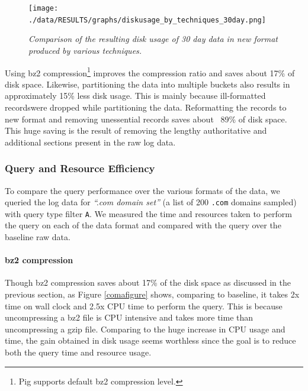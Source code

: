 \documentclass[11pt,a4paper]{article}
\begin{document}
\begin{figure}[H] 
\centering
\texttt{[image: ./data/RESULTS/graphs/diskusage\_by\_techniques\_30day.png]}
\caption {\textit{Comparison of the resulting disk usage of 30 day data in new format produced by various techniques.}}
\end{figure}

Using bz2 compression\footnote{Pig supports default bz2 compression level.} improves the compression ratio and saves about 17\% of disk space. Likewise, partitioning the data into multiple buckets also results in approximately 15\% less disk usage. This is mainly because ill-formatted records\footnotemark were dropped while partitioning the data. Reformatting the records to new format and removing unessential records saves about ~89\% of disk space. This huge saving is the result of removing the lengthy authoritative and additional sections present in the raw log data.

\subsubsection{Query and Resource Efficiency}
To compare the query performance over the various formats of the data, we queried the log data for \textit{``.com domain set''} (a list of 200 \texttt{.com} domains sampled) with query type filter \texttt{A}. We measured the time and resources taken to perform the query on each of the data format and compared with the query over the baseline raw data.

\paragraph{bz2 compression}Though bz2 compression saves about 17\% of the disk space as discussed in the previous section, as Figure \ref{comafigure} shows, comparing to baseline, it takes 2x time on wall clock and 2.5x CPU time to perform the query. This is because uncompressing a bz2 file is CPU intensive and takes more time than uncompressing a gzip file. Comparing to the huge increase in CPU usage and time, the gain obtained in disk usage seems worthless since the goal is to reduce both the query time and resource usage.
\end{document}
